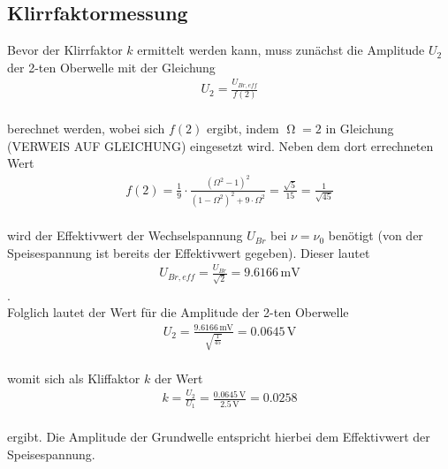 \subsection{Klirrfaktormessung}

Bevor der Klirrfaktor $k$ ermittelt werden kann, muss zunächst die Amplitude $U_{2}$ der 2-ten Oberwelle
mit der Gleichung
\begin{align}
U_{2} = \frac{U_{Br,eff}}{f(2)}
\end{align}
\\
berechnet werden, wobei sich $f(2)$ ergibt, indem $\upOmega = 2$ in Gleichung (VERWEIS AUF GLEICHUNG) eingesetzt wird.
Neben dem dort errechneten Wert
\begin{align}
f(2) =  \frac{1}{9} \cdot \frac{(\Omega^2 - 1)^2}{(1 - \Omega^2)^2 + 9 \cdot \Omega^2}  = \frac{\sqrt{5}}{15} = \frac{1}{\sqrt{45}} \nonumber
\end{align}
\\
wird der Effektivwert der Wechselspannung $U_{Br}$ bei $\nu = \nu_{0}$ benötigt (von der Speisespannung ist bereits der Effektivwert gegeben). Dieser lautet
\begin{align}
U_{Br,eff} = \frac{U_{Br}}{\sqrt{2}} = 9.6166\, \si{\milli\volt} \nonumber
\end{align}.
\\
Folglich lautet der Wert für die Amplitude der 2-ten Oberwelle
\begin{align}
U_{2} = \frac{9.6166\, \si{\milli\volt}}{\sqrt{\frac{1}{45}}} = 0.0645\, \si{\volt} \nonumber
\end{align}
\\womit sich als Kliffaktor $k$ der Wert
\begin{align}
k = \frac{U_{2}}{U_{1}} = \frac{0.0645\, \si{\volt}}{2.5\, \si{\volt}} = 0.0258 \nonumber
\end{align}
\\ 
ergibt. Die Amplitude der Grundwelle entspricht hierbei dem Effektivwert der Speisespannung.
